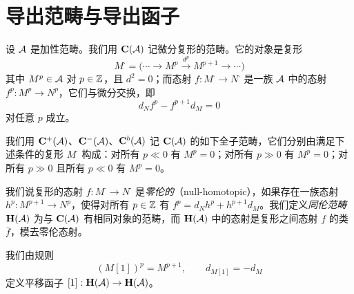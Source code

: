 \section{导出范畴与导出函子}

设 $\mathcal{A}$ 是加性范畴。我们用 $\mathbf{C}(\mathcal{A})$ 记微分复形的范畴。它的对象是复形
\begin{equation*}
M^{\cdot}=\bigl(\cdots\longrightarrow M^{p}\xrightarrow{\ d^{p}\ }M^{p+1}\longrightarrow\cdots\bigr)
\end{equation*}
其中 $M^{p}\in\mathcal{A}$ 对 $p\in\mathbb{Z}$，且 $d^{2}=0$；而态射 $f:M^{\cdot}\to N^{\cdot}$ 是一族 $\mathcal{A}$ 中的态射 $f^{p}:M^{p}\to N^{p}$，它们与微分交换，即
\begin{equation*}
d_{N}f^{p}-f^{p+1}d_{M}=0
\end{equation*}
对任意 $p$ 成立。

我们用 $\mathbf{C}^{+}(\mathcal{A})$、$\mathbf{C}^{-}(\mathcal{A})$、$\mathbf{C}^{b}(\mathcal{A})$ 记 $\mathbf{C}(\mathcal{A})$ 的如下全子范畴，它们分别由满足下述条件的复形 $M^{\cdot}$ 构成：对所有 $p\ll 0$ 有 $M^{p}=0$；对所有 $p\gg 0$ 有 $M^{p}=0$；对所有 $p\gg 0$ 且所有 $p\ll 0$ 有 $M^{p}=0$。

我们说复形的态射 $f:M^{\cdot}\to N^{\cdot}$ 是\emph{零伦的}（null-homotopic），如果存在一族态射 $h^{p}:M^{p+1}\to N^{p}$，使得对所有 $p\in\mathbb{Z}$ 有 $f^{p}=d_{N}h^{p}+h^{p+1}d_{M}$。我们定义\emph{同伦范畴} $\mathbf{H}(\mathcal{A})$ 为与 $\mathbf{C}(\mathcal{A})$ 有相同对象的范畴，而 $\mathbf{H}(\mathcal{A})$ 中的态射是复形之间态射 $f$ 的类 $\overline{f}$，模去零伦态射。

我们由规则
\begin{equation*}
(M[1])^{p}=M^{p+1},\qquad d_{M[1]}=-d_{M}
\end{equation*}
定义平移函子 $[1]:\mathbf{H}(\mathcal{A})\to\mathbf{H}(\mathcal{A})$。

